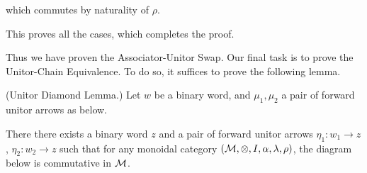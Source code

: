 \begin{varprf}
\begin{center}
    \end{center}
    which commutes by naturality of $\rho$. 
    
    This proves all the cases, which completes the proof.
\end{varprf}

Thus we have proven the Associator-Unitor Swap. Our final task is to 
prove the Unitor-Chain Equivalence. To do so, it suffices to prove the following lemma. 

\begin{lemma}(Unitor Diamond Lemma.)
    Let $w$ be a binary word, and $\mu_1, \mu_2$ a pair of forward unitor arrows 
    as below. 
    \begin{center}
    \end{center}
    There there exists a binary word $z$ and a pair
    of forward unitor arrows 
    $\eta_1: w_1 \to z$, $\eta_2: w_2 \to z$ such that for any 
    monoidal category $(\mathcal{M}, \otimes, I, \alpha, \lambda, \rho)$, 
    the diagram below is commutative in $\mathcal{M}$.
    \begin{center}
    \end{center}
\end{lemma}

